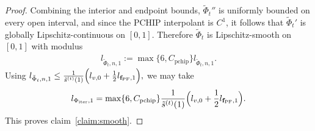 \documentclass{article}
\newcommand{\fPF}{{\mathbf{f}_{\rm PF}}}
\newcommand{\Farc}{\Phi}
\begin{document}
\begin{proof}
Combining the interior and endpoint bounds, $\tilde \Farc_t''$ is uniformly bounded on every
open interval, and since the PCHIP interpolant is $C^1$, it follows that $\tilde \Farc_t'$ is globally Lipschitz-continuous on $[0,1]$. Therefore $\tilde \Farc_t$ is
Lipschitz-smooth on $[0,1]$ with modulus
\begin{align}
l_{\tilde \Farc_t,n,1}
:=
\max\{6,C_{\mathrm{pchip}}\}l_{\tilde \Farc_t,n,1}.
\end{align}
Using
$
l_{\tilde \Farc_t,n,1}\le \frac{1}{\tilde s^{(t)}(1)}\Bigl(l_{v,0}+\frac12 l_{\fPF,1}\Bigr),
$
we may take
\begin{align}
l_{\Farc_{\rm iter},1}
=
\max\{6,C_{\mathrm{pchip}}\}
\frac{1}{\tilde s^{(t)}(1)}\Bigl(l_{v,0}+\frac12 l_{\fPF,1}\Bigr).
\end{align}
This proves claim~\ref{claim:smooth}.
\end{proof}
\end{document}
